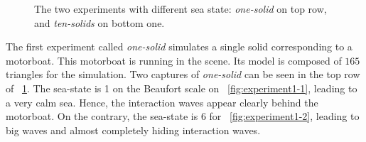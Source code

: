 \documentclass[final]{jcgt}
\begin{document}
\begin{figure}[htbp]
	\centering

	\hspace{1cm}
    \vspace{1cm}
	\hspace{1cm}
	\caption{The two experiments with different sea state: \emph{one-solid} on top row, and \emph{ten-solids} on bottom one.}
	\label{fig:experiments}
\end{figure}

The first experiment called \emph{one-solid} simulates a single solid corresponding to a motorboat.
This motorboat is running in the scene.
Its model is composed of $165$ triangles for the simulation. 
Two captures of \emph{one-solid} can be seen in the top row of \figurename~\ref{fig:experiments}.
The sea-state is 1 on the Beaufort scale on \figurename~\ref{fig:experiment1-1}, leading to a very calm sea.
Hence, the interaction waves appear clearly behind the motorboat. 
On the contrary, the sea-state is 6 for \figurename~\ref{fig:experiment1-2}, leading to big waves and almost completely hiding interaction waves.
\end{document}

